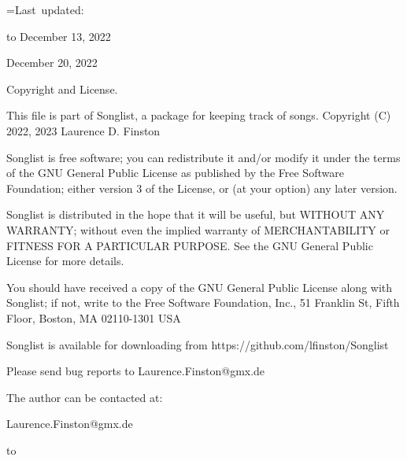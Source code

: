 \small
{}=\hbox{Last updated:\quad}

\leavevmode\hbox to December 13, 2022

\leavevmode{} December 20, 2022 %

Copyright and License.

This file is part of Songlist, a package for keeping track of songs.
Copyright (C) 2022, 2023 Laurence D. Finston

Songlist is free software; you can redistribute it and/or modify 
it under the terms of the GNU General Public License as published by 
the Free Software Foundation; either version 3 of the License, or 
(at your option) any later version.  

Songlist is distributed in the hope that it will be useful, 
but WITHOUT ANY WARRANTY; without even the implied warranty of 
MERCHANTABILITY or FITNESS FOR A PARTICULAR PURPOSE.  See the 
GNU General Public License for more details.  

You should have received a copy of the GNU General Public License 
along with Songlist; if not, write to the Free Software 
Foundation, Inc., 51 Franklin St, Fifth Floor, Boston, MA  02110-1301  USA 

Songlist is available for downloading from 
https://github.com/lfinston/Songlist

Please send bug reports to Laurence.Finston@gmx.de

The author can be contacted at: 

Laurence.Finston@gmx.de
\endgroup


\vbox to 
\vfil\eject


\bye





